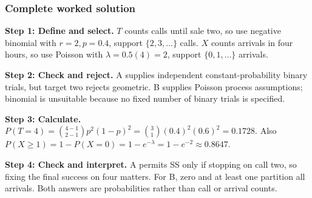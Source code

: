 \subsubsection*{Complete worked solution}
\par\noindent\begin{minipage}{\linewidth}
\textbf{Step 1: Define and select.} $T$ counts calls until sale two, so use negative binomial with $r=2,p=0.4$, support $\{2,3,\ldots\}$ calls. $X$ counts arrivals in four hours, so use Poisson with $\lambda=0.5(4)=2$, support $\{0,1,\ldots\}$ arrivals.
\end{minipage}\par\medskip
\par\noindent\begin{minipage}{\linewidth}
\textbf{Step 2: Check and reject.} A supplies independent constant-probability binary trials, but target two rejects geometric. B supplies Poisson process assumptions; binomial is unsuitable because no fixed number of binary trials is specified.
\end{minipage}\par\medskip
\par\noindent\begin{minipage}{\linewidth}
\textbf{Step 3: Calculate.} $P(T=4)=\binom{4-1}{2-1}p^2(1-p)^2=\binom31(0.4)^2(0.6)^2=0.1728$. Also $P(X\geq1)=1-P(X=0)=1-e^{-\lambda}=1-e^{-2}\approx0.8647$.
\end{minipage}\par\medskip
\par\noindent\begin{minipage}{\linewidth}
\textbf{Step 4: Check and interpret.} A permits SS only if stopping on call two, so fixing the final success on four matters. For B, zero and at least one partition all arrivals. Both answers are probabilities rather than call or arrival counts.
\end{minipage}\par\medskip
